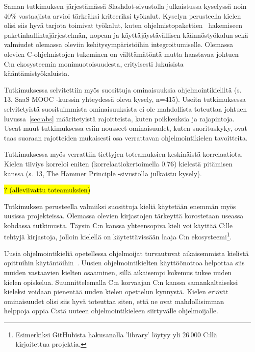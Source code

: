 Saman tutkimuksen järjestämässä Slashdot-sivustolla julkaistussa kyselyssä noin
40\% vastaajista arvioi tärkeäksi kriteeriksi työkalut. Kyselyn perusteella
kielen olisi siis hyvä tarjota toimivat työkalut, kuten
ohjelmistopakettien~ hakemiseen
paketinhallintajärjestelmän, nopean ja
käyttäjäystävällisen käännöstyökalun sekä valmiudet olemassa oleviin
kehitysympäristöihin integroitumiselle. Olemassa olevien C-ohjelmistojen
tukeminen on välttämätöntä mutta haastavaa johtuen C:n ekosysteemin
monimuotoisuudesta, erityisesti lukuisista kääntämistyökaluista.

Tutkimuksessa selvitettiin myös suosittuja ominaisuuksia ohjelmointikieliltä
(s. 13, SaaS MOOC -kurssin yhteydessä oleva kysely, n=415). Useita
tutkimuksessa selvitetyistä suosituimmista ominaisuuksista ei ole mahdollista
toteuttaa johtuen luvussa~\ref{sec:abs} määritetyistä rajoitteista, kuten
poikkeuksia ja rajapintoja. Useat muut tutkimuksessa esiin nousseet
ominaisuudet, kuten suorituskyky, ovat taas suoraan rajotteiden mukaisesti osa
verrattavan ohjelmointikielen tavoitteita.

Tutkimuksessa myös verrattiin tiettyjen toteamuksien keskinäistä korrelaatiota.
Kielen tiiviys korreloi eniten (korrelaatiokertoimella 0.76) kielestä pitämisen
kanssa (s. 13, The Hammer Principle -sivustolla julkaistu kysely).

\hl{? (alleviivattu toteamuksien)}


Tutkimuksen perusteella valmiiksi suosittuja kieliä käytetään enemmän myös
uusissa projekteissa. Olemassa olevien kirjastojen tärkeyttä korostetaan
useassa kohdassa tutkimusta. Täysin C:n kanssa yhteensopiva kieli voi käyttää
C:lle tehtyjä kirjastoja, jolloin kielellä on käytettävissään laaja C:n
ekosysteemi\footnote{Esimerkiksi GitHubista hakusanalla 'library' löytyy yli
26\,000 C:llä kirjoitettua projektia.}.

Uusia ohjelmointikieliä opetellessa ohjelmoijat turvautuvat aikaisemmista
kielistä opittuihin käytäntöihin~\citep{languagelearning}. Uusien
ohjelmointikielten käyttöönottoa helpottaa siis muiden vastaavien kielten
osaaminen, sillä aikaisempi kokemus tukee uuden kielen opiskelua.
Suunnittelemalla C:n korvaajan C:n kanssa samankaltaiseksi kieleksi voidaan
pienentää uuden kielen opettelun kynnystä. Kielen eriävät ominaisuudet olisi
siis hyvä toteuttaa siten, että ne ovat mahdollisimman helppoja oppia C:stä
uuteen ohjelmointikieleen siirtyvälle ohjelmoijalle.

